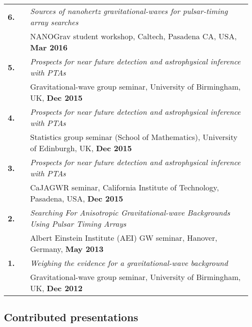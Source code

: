 \documentclass[11pt,letterpaper,sans]{moderncv}
\begin{document}
{\begin{longtable}{rp{0.3cm}p{15.8cm}}
\textbf{6.} & & \textit{Sources of nanohertz gravitational-waves for pulsar-timing array searches} \\ 
&& NANOGrav student workshop, Caltech, Pasadena CA, USA, \textbf{Mar 2016} \vspace{0.09cm}\\
\textbf{5.} & & \textit{Prospects for near future detection and astrophysical inference with PTAs} \\ 
&& Gravitational-wave group seminar, University of Birmingham, UK, \textbf{Dec 2015} \vspace{0.09cm}\\
\textbf{4.} & & \textit{Prospects for near future detection and astrophysical inference with PTAs} \\ 
&& Statistics group seminar (School of Mathematics), University of Edinburgh, UK, \textbf{Dec 2015} \vspace{0.09cm}\\
\textbf{3.} & & \textit{Prospects for near future detection and astrophysical inference with PTAs} \\ 
&& CaJAGWR seminar, California Institute of Technology, Pasadena, USA, \textbf{Dec 2015} \vspace{0.09cm}\\
\textbf{2.} & & \textit{Searching For Anisotropic Gravitational-wave Backgrounds Using Pulsar Timing Arrays} \\ 
&& Albert Einstein Institute (AEI) GW seminar, Hanover, Germany, \textbf{May 2013} \vspace{0.09cm}\\
\textbf{1.} & & \textit{Weighing the evidence for a gravitational-wave background} \\ 
&& Gravitational-wave group seminar, University of Birmingham, UK, \textbf{Dec 2012} 
\end{longtable}
}

\subsection{Contributed presentations} \vspace{-0.3cm}
\end{document}
